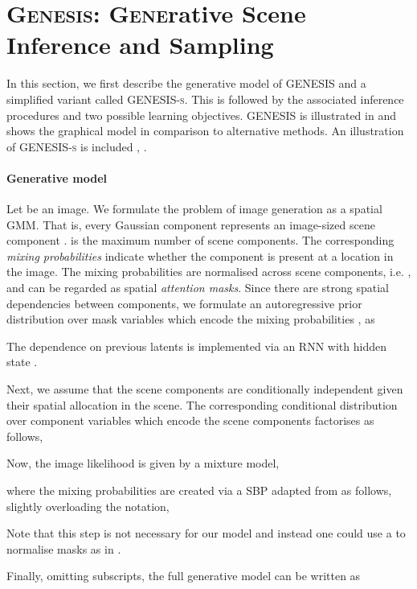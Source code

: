 \documentclass{article}
\begin{document}
 \section{\textsc{Genesis}: \textsc{Gene}rative \textsc{S}cene \textsc{I}nference and \textsc{S}ampling}
\label{sec:compositional}


In this section, we first describe the generative model of \gls{GENESIS} and a simplified variant called \gls{GENESIS}\textsc{-s}.
This is followed by the associated inference procedures and two possible learning objectives.
\gls{GENESIS} is illustrated in  and  shows the graphical model in comparison to alternative methods.
An illustration of \gls{GENESIS}\textsc{-s} is included , .

\paragraph{Generative model}
Let  be an image.
We formulate the problem of image generation as a spatial \gls{GMM}.
That is, every Gaussian component  represents an image-sized scene component .
 is the maximum number of scene components.
The corresponding \emph{mixing probabilities}  indicate whether the component is present at a location in the image.
The mixing probabilities are normalised across scene components, i.e. , and can be regarded as spatial \emph{attention masks}.
Since there are strong spatial dependencies between components, we formulate an autoregressive prior distribution over mask variables  which encode the mixing probabilities , as

The dependence on previous latents  is implemented via an \gls{RNN}  with hidden state .

Next, we assume that the scene components  are conditionally independent given their spatial allocation in the scene.
The corresponding conditional distribution over component variables \mbox{} which encode the scene components  factorises as follows,

Now, the image likelihood is given by a mixture model,

where the mixing probabilities  are created via a \gls{SBP} adapted from \citet{burgess2019monet} as follows, slightly overloading the  notation,

Note that this step is not necessary for our model and instead one could use a  to normalise masks as in \citet{greff2019multi}. 

Finally, omitting subscripts, the full generative model can be written as
\end{document}
